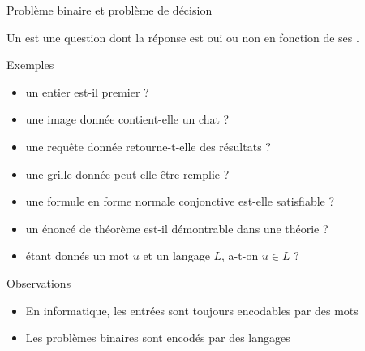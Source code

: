 
\begingroup

\begin{frame}{Problème binaire et problème de décision}

  Un  est une question dont la réponse est \alert{oui} ou \alert{non} en fonction de ses .

  \begin{exampleblock}{Exemples}
    \begin{itemize}
    \item {} un entier est-il premier ?  
    \item {} une image donnée contient-elle un chat ? 
    \item {} une requête donnée retourne-t-elle des résultats ?  
    \item {} une grille donnée peut-elle être remplie ? 
    \item {} une formule en forme normale conjonctive est-elle satisfiable ? 
    \item {} un énoncé de théorème est-il démontrable dans une théorie ? 
    \item {} étant donnés un mot $u$ et un langage $L$, a-t-on $u\in L$ ? 
    \end{itemize}
  \end{exampleblock}
  
  \begin{alertblock}{Observations}
    \begin{itemize}
    \item En informatique, les entrées sont toujours encodables par des mots
    \item \alert{Les problèmes binaires sont encodés par des langages}
    \end{itemize}
  \end{alertblock}
  
\end{frame}

\endgroup
\endinput
